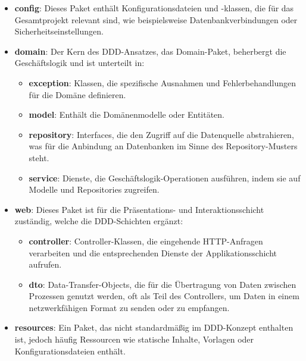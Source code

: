 \begin{itemize}
    \item \textbf{config}: Dieses Paket enthält Konfigurationsdateien und -klassen, die für das Gesamtprojekt relevant sind, wie beispielsweise Datenbankverbindungen oder Sicherheitseinstellungen.
    
    \item \textbf{domain}: Der Kern des DDD-Ansatzes, das Domain-Paket, beherbergt die Geschäftslogik und ist unterteilt in:
    \begin{itemize}
        \item \textbf{exception}: Klassen, die spezifische Ausnahmen und Fehlerbehandlungen für die Domäne definieren.
        \item \textbf{model}: Enthält die Domänenmodelle oder Entitäten.
        \item \textbf{repository}: Interfaces, die den Zugriff auf die Datenquelle abstrahieren, was für die Anbindung an Datenbanken im Sinne des Repository-Musters steht.
        \item \textbf{service}: Dienste, die Geschäftslogik-Operationen ausführen, indem sie auf Modelle und Repositories zugreifen.
    \end{itemize}
    
    \item \textbf{web}: Dieses Paket ist für die Präsentations- und Interaktionsschicht zuständig, welche die DDD-Schichten ergänzt:
    \begin{itemize}
        \item \textbf{controller}: Controller-Klassen, die eingehende HTTP-Anfragen verarbeiten und die entsprechenden Dienste der Applikationsschicht aufrufen.
        \item \textbf{dto}: Data-Transfer-Objects, die für die Übertragung von Daten zwischen Prozessen genutzt werden, oft als Teil des Controllers, um Daten in einem netzwerkfähigen Format zu senden oder zu empfangen.
    \end{itemize}
    
    \item \textbf{resources}: Ein Paket, das nicht standardmäßig im DDD-Konzept enthalten ist, jedoch häufig Ressourcen wie statische Inhalte, Vorlagen oder Konfigurationsdateien enthält.
\end{itemize}
